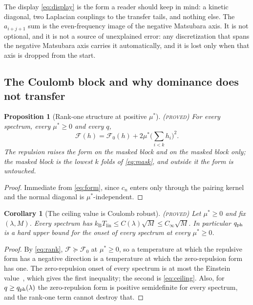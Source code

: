 \documentclass[11pt]{article}
\newcommand{\kb}{k_{\mathrm B}}
\newcommand{\Tlin}{T_{\mathrm{lin}}}
\newcommand{\Fcal}{\mathcal F}
\newcommand{\muS}{\mu^{*}}
\newtheorem{corollary}[theorem]{Corollary}
\newtheorem{proposition}[theorem]{Proposition}
\theoremstyle{definition}
\theoremstyle{remark}
\newcommand{\proved}{\textnormal{\textsc{(proved)}}}
\begin{document}
The display \eqref{eq:display} is the form a reader should keep in mind: a kinetic
diagonal, two Laplacian couplings to the transfer tails, and nothing else. The
$a_{i+j+1}$ sum is the even-frequency image of the negative Matsubara axis. It is not
optional, and it is not a source of unexplained error: any discretization that spans the
negative Matsubara axis carries it automatically, and it is lost only when that axis is
dropped from the start.

\subsection{The Coulomb block and why dominance does not transfer}

\begin{proposition}[Rank-one structure at positive $\muS$]\label{prop:rank}\proved
For every spectrum, every $\muS\ge0$ and every $q$,
\begin{equation}\label{eq:rank}
\Fcal(h)=\Fcal_0(h)+2\muS\Big(\sum_{i<k}h_i\Big)^2 .
\end{equation}
The repulsion raises the form on the masked block and on the masked block only; the
masked block is the lowest $k$ folds of \eqref{eq:mask}, and outside it the form is
untouched.
\end{proposition}
\begin{proof}
Immediate from \eqref{eq:form}, since $c_n$ enters only through the pairing kernel and the
normal diagonal is $\muS$-independent.
\end{proof}

\begin{corollary}[The ceiling value is Coulomb robust]\label{cor:value}\proved
Let $\muS\ge0$ and fix $(\lambda,M)$. Every spectrum has
$\kb\Tlin\le C(\lambda)\sqrt M\le C_\infty\sqrt M$. In particular $q_{\rm ph}$
is a hard upper bound for the onset of every spectrum at every $\muS\ge0$.
\end{corollary}
\begin{proof}
By \eqref{eq:rank}, $\Fcal\succeq\Fcal_0$ at $\muS\ge0$, so a temperature at which the
repulsive form has a negative direction is a temperature at which the zero-repulsion form
has one. The zero-repulsion onset of every spectrum is at most the Einstein
value~\cite{rens,kondratev}, which gives the first inequality; the second is
\eqref{eq:ceiling}. Also, for $q\ge q_{\rm ph}(\lambda)$ the zero-repulsion form is
positive semidefinite for every spectrum, and the rank-one term cannot destroy that.
\end{proof}
\end{document}
